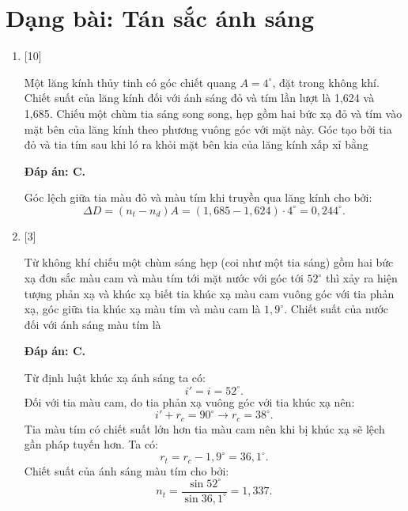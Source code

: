 \section{Dạng bài: Tán sắc ánh sáng}
\begin{enumerate}[label=\bfseries Câu \arabic*:]

    \item {} [10]
    
	\cauhoi
	{Một lăng kính thủy tinh có góc chiết quang $A = 4 ^\circ$, đặt trong không khí. Chiết suất của lăng kính đối với ánh sáng đỏ và tím lần lượt là 1,624 và 1,685. Chiếu một chùm tia sáng song song, hẹp gồm hai bức xạ đỏ và tím vào mặt bên của lăng kính theo phương vuông góc với mặt này. Góc tạo bởi tia đỏ và tia tím sau khi ló ra khỏi mặt bên kia của lăng kính xấp xỉ bằng
	}
	
	\loigiai
	{		\textbf{Đáp án: C.}
		
Góc lệch giữa tia màu đỏ và màu tím khi truyền qua lăng kính cho bởi:
$$
\Delta D = (n_{t} - n_{d})A = (1,685 - 1,624) \cdot 4^\circ = 0,244^\circ.
$$
		
	}

    \item {} [3]
    
	\cauhoi
	{Từ không khí chiếu một chùm sáng hẹp (coi như một tia sáng) gồm hai bức xạ đơn sắc màu cam và màu tím tới mặt nước với góc tới $52^\circ$  thì xảy ra hiện tượng phản xạ và khúc xạ biết tia khúc xạ màu cam vuông góc với tia phản xạ, góc giữa tia khúc xạ màu tím và màu cam là $1,9^\circ$. Chiết suất của nước đối với ánh sáng màu tím là
	}
	
	\loigiai
	{		\textbf{Đáp án: C.}
		
Từ định luật khúc xạ ánh sáng ta có:
$$
i' = i = 52^\circ.
$$
Đối với tia màu cam, do tia phản xạ vuông góc với tia khúc xạ nên:
$$
i' + r_{c} = 90^\circ \rightarrow r_{c} = 38^\circ.
$$
Tia màu tím có chiết suất lớn hơn tia màu cam nên khi bị khúc xạ sẽ lệch gần pháp tuyến hơn. Ta có:
$$
r_{t} = r_{c} - 1,9^\circ = 36,1^\circ.
$$
Chiết suất của ánh sáng màu tím cho bởi:
$$
n_{t} = \dfrac{\sin{52^\circ}}{\sin{36,1^\circ}} = 1,337.
$$
		
	}

\end{enumerate}

